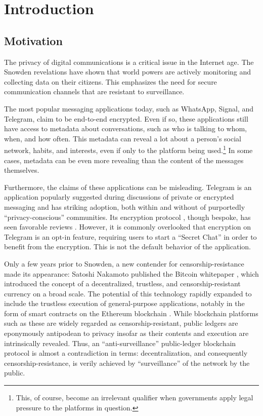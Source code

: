 \chapter{Introduction}

\label{Introduction}

\section{Motivation}\label{motivation}

The privacy of digital communications is a critical issue in the Internet age. The Snowden revelations \parencite{greenwald_nsa_2013} have shown that world powers are actively monitoring and collecting data on their citizens. This emphasizes the need for secure communication channels that are resistant to surveillance.

The most popular messaging applications today, such as WhatsApp, Signal, and Telegram, claim to be end-to-end encrypted. Even if so, these applications still have access to metadata about conversations, such as who is talking to whom, when, and how often. This metadata can reveal a lot about a person's social network, habits, and interests, even if only to the platform being used.\footnote{This, of course, become an irrelevant qualifier when governments apply legal pressure to the platforms in question.} In some cases, metadata can be even more revealing than the content of the messages themselves.

Furthermore, the claims of these applications can be misleading. Telegram is an application popularly suggested during discussions of private or encrypted messaging \parencite{collins_best_2022, key_best_2024} and has striking adoption, both within and without of purportedly ``privacy-conscious'' communities. Its encryption protocol \parencite{telegram_mtproto_2021}, though bespoke, has seen favorable reviews \parencite{miculan_automated_2023}. However, it is commonly overlooked that encryption on Telegram is an opt-in feature, requiring users to start a ``Secret Chat'' in order to benefit from the encryption. This is not the default behavior of the application.

\bigskip

Only a few years prior to Snowden, a new contender for censorship-resistance made its appearance: Satoshi Nakamoto published the Bitcoin whitepaper \parencite{nakamoto_bitcoin_2008}, which introduced the concept of a decentralized, trustless, and censorship-resistant currency on a broad scale. The potential of this technology rapidly expanded to include the trustless execution of general-purpose applications, notably in the form of smart contracts on the Ethereum blockchain \parencite{buterin_ethereum_2014}. While blockchain platforms such as these are widely regarded as censorship-resistant, public ledgers are eponymously antipodean to privacy insofar as their contents and execution are intrinsically revealed. Thus, an ``anti-surveillance'' public-ledger blockchain protocol is almost a contradiction in terms: decentralization, and consequently censorship-resistance, is verily achieved by ``surveillance'' of the network by the public.

